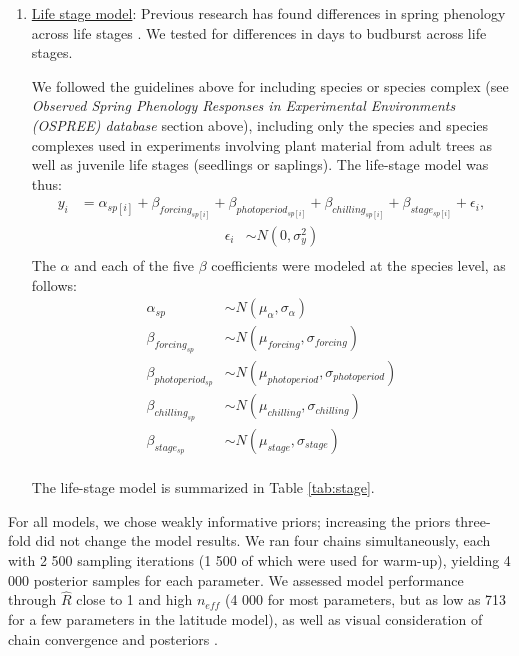 \documentclass{article}
\begin{document}
\begin{enumerate}
\item \underline{Life stage model}:
Previous research has found differences in spring phenology across life stages \emph{\citep[][]{vitasse2013ont}}. We tested for differences in days to budburst across life stages. 
\par We followed the guidelines above for including species or species complex (see \emph{Observed Spring Phenology Responses in Experimental Environments (OSPREE) database} section above), including only the species and species complexes used in experiments involving plant material from adult trees as well as juvenile life stages (seedlings or saplings). The life-stage model was thus:
\begin{align*}
y_i &= \alpha_{sp[i]} + \beta_{forcing_{sp[i]}} + \beta_{photoperiod_{sp[i]}} + \beta_{chilling_{sp[i]}} + \beta_{stage_{sp[i]}} + \epsilon_{i},
\end{align*}
\begin{align*}
\epsilon_i & \sim N(0,\sigma^2_y) \\
\end{align*}
\noindent The $\alpha$ and each of the five $\beta$ coefficients were modeled at the species level, as follows:
\begin{align*}
\alpha_{sp} & \sim N(\mu_{\alpha}, \sigma_{\alpha}) \\
\beta_{forcing_{sp}} & \sim N(\mu_{forcing}, \sigma_{forcing}) \\
\beta_{photoperiod_{sp}} & \sim N(\mu_{photoperiod}, \sigma_{photoperiod})\\
\beta_{chilling_{sp}} & \sim N(\mu_{chilling}, \sigma_{chilling})\\
\beta_{stage_{sp}} & \sim N(\mu_{stage}, \sigma_{stage})\\
\end{align*}
\par The life-stage model is summarized in Table \ref{tab:stage}.

\end{enumerate}
\noindent For all models, we chose weakly informative priors; increasing the priors three-fold did not change the model results. We ran four chains simultaneously, each with 2 500 sampling iterations (1 500 of which were used for warm-up), yielding 4 000 posterior samples for each parameter. We assessed model performance through $\hat{R}$ close to 1 and high $n_{eff}$ (4 000 for most parameters, but as low as 713 for a few parameters in the latitude model), as well as visual consideration of chain convergence and posteriors \emph{\citep{BDA}}. 
\end{document}
